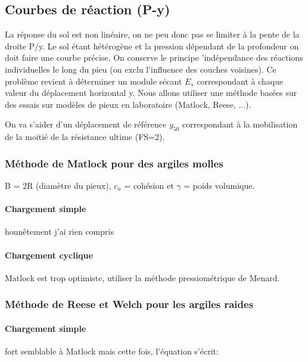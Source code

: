 \subsection{Courbes de réaction (P-y)}

La réponse du sol est non linéaire, on ne peu donc pas se limiter à la pente de la droite P/y. Le sol étant hétérogène et la pression dépendant de la profondeur on doit faire une courbe précise. On conserve le principe 'indépendance des réactions individuelles le long du pieu (on exclu l'influence des couches voisines). Ce problème revient à déterminer un module sécant $E_s$ correspondant à chaque valeur du déplacement horizontal y. Nous allons utiliser une méthode basées sur des essais sur modèles de pieux en laboratoire (Matlock, Reese, ...).

On va s'aider d'un déplacement de référence $y_50$ correspondant à la mobilisation de la moitié de la résistance ultime (FS=2).

\subsubsection{Méthode de Matlock pour des argiles molles}

B = 2R (diamètre du pieux), $c_u$ = cohésion et $\gamma$ = poids volumique.

\paragraph{Chargement simple}

honnêtement j'ai rien compris 

\paragraph{Chargement cyclique}

Matlock est trop optimiste, utiliser la méthode pressiométrique de Menard.

\subsubsection{Méthode de Reese et Welch pour les argiles raides}

\paragraph{Chargement simple}

fort semblable à Matlock mais cette fois, l'équation s'écrit:

